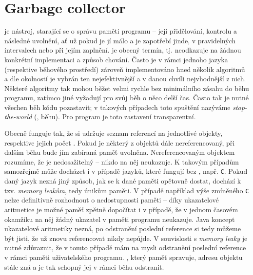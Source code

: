 \section{Garbage collector}
 je nástroj, starající se o správu paměti programu -- její přidělování, kontrolu a následné uvolnění, ať už pokud je jí málo a je zapotřebí jinde, v pravidelných intervalech nebo při jejím zaplnění.  je obecný termín, tj. neodkazuje na žádnou konkrétní implementaci a způsob chování. Často je v rámci jednoho jazyka (respektive běhového prostředí) zároveň implementováno hned několik algoritmů  a dle okolností je vybrán ten nejefektivnější a v danou chvíli nejvhodnější z nich. Některé algoritmy tak mohou běžet velmi rychle bez minimálního zásahu do běhu programu, zatímco jiné vyžadují pro svůj běh o něco delší čas. Často tak je nutné všechen běh kódu pozastavit; v takových případech toto spuštění  nazýváme \textit{stop-the-world} (, běhu). Pro program je toto zastavení transparentní.

Obecně  funguje tak, že si udržuje seznam referencí na jednotlivé objekty, respektive jejich počet \cite{gc-functionality}. Pokud je některý z objektů dále nereferencovaný, při dalším běhu  bude jím zabíraná paměť uvolněna. Nereferencovaným objektem rozumíme, že je nedosažitelný -- nikdo na něj neukazuje. K takovým případům samozřejmě může docházet i v případě jazyků, které fungují bez , např. \texttt{C}. Pokud daný jazyk nezná jiný způsob, jak se k dané paměti opětovně dostat, dochází k tzv. \textit{memory leakům}, tedy únikům paměti. V případě například výše zmíněného \texttt{C} nelze definitivně rozhodnout o nedostupnosti paměti -- díky ukazatelové aritmetice je možné paměť zpětně dopočítat i v případě, že v jednom časovém okamžiku na něj žádný ukazatel v paměti programu neukazuje. Java koncept ukazatelové aritmetiky nezná, po odstranění poslední reference si tedy můžeme být jisti, že už znovu referencovat nikdy nepůjde. V souvislosti s \textit{memory leaky} je nutné zdůraznit, že v tomto případě mám na mysli odstranění poslední reference v rámci paměti uživatelského programu. , který paměť spravuje, adresu objektu stále zná a je tak schopný jej v rámci běhu  odstranit.



